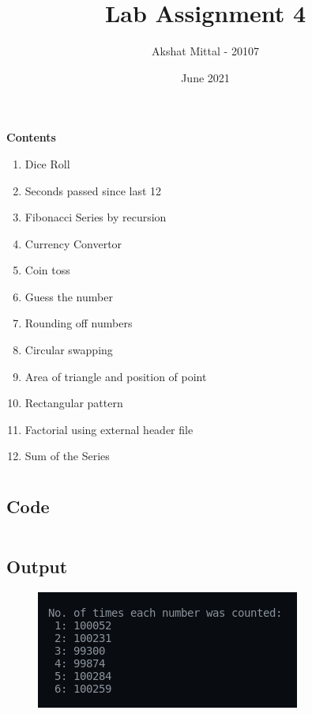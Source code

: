 \documentclass[12pt]{article}
\title{Lab Assignment 4}
\author{Akshat Mittal - 20107}
\date{June 2021}
\begin{document}
\maketitle
\vspace{7mm}
\textbf{Contents}
\vspace{7mm}
\begin{enumerate}
    \item Dice Roll
    \item Seconds passed since last 12
    \item Fibonacci Series by recursion
    \item Currency Convertor
    \item Coin toss
    \item Guess the number
    \item Rounding off numbers
    \item Circular swapping
    \item Area of triangle and position of point
    \item Rectangular pattern
    \item Factorial using external header file
    \item Sum of the Series
\end{enumerate}

\newpage
\section{}
\subsection{Code}
\inputminted{c}{q1.c}
\subsection{Output}
\begin{figure}[h]
    \centering
    \includegraphics{1.png}
\end{figure}

\newpage
\section{}
\end{document}
